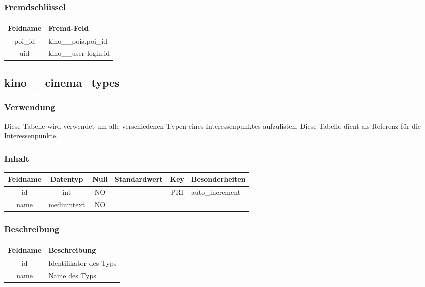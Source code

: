 \subsubsection{Fremdschlüssel}
\begin{table}[H]
	\begin{tabular}{|c|p{12.5cm}|}
		\hline
		\textbf{Feldname} & \textbf{Fremd-Feld} \\ \hline
		poi\_id & kino\_\_pois.poi\_id \\ \hline
		uid & kino\_\_user-login.id \\ \hline
	\end{tabular}
\end{table}
\subsection{kino\_\_cinema\_types}
\subsubsection{Verwendung} Diese Tabelle wird verwendet um alle verschiedenen Typen eines Interessenpunktes aufzulisten. Diese Tabelle dient als Referenz für die Interessenpunkte.
\subsubsection{Inhalt}
\begin{table}[H]
	\begin{tabular}{|c|c|c|c|c|p{3.5cm}|}
		\hline
		\textbf{Feldname} & \textbf{Datentyp} & \textbf{Null} & \textbf{Standardwert} & \textbf{Key}   & \textbf{Besonderheiten} \\ \hline
		id & int & NO &  & PRI & auto\_increment \\ \hline
		name & mediumtext & NO &  &  &  \\ \hline
	\end{tabular}
\end{table}
\subsubsection{Beschreibung}
\begin{table}[H]
	\begin{tabular}{|c|p{12cm}|}
		\hline
		\textbf{Feldname} & \textbf{Beschreibung} \\ \hline
		id & Identifikator des Typs \\ \hline
		name & Name des Typs \\ \hline
	\end{tabular}
\end{table}
